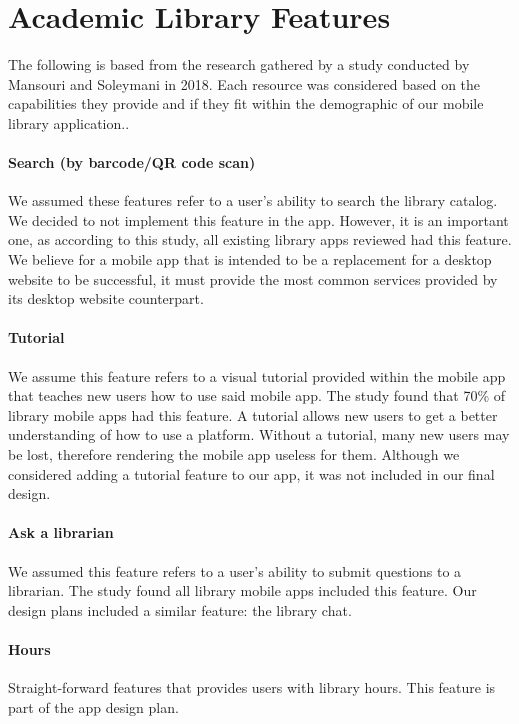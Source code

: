 \section{Academic Library Features}

    \noindent{} The following is based from the research gathered by a study conducted by Mansouri and  Soleymani in 2018. Each resource was considered based on the capabilities they provide and if they fit within the demographic of our mobile library application..
    
    \paragraph{Search (by barcode/QR code scan)}
    We assumed these features refer to a user's ability to search the library catalog. We decided to not implement this feature in the \appname app. However, it is an important one, as according to this study, all existing library apps reviewed had this feature. We believe for a mobile app that is intended to be a replacement for a desktop website to be successful, it must provide the most common services provided by its desktop website counterpart.
    
    \paragraph{Tutorial}
    We assume this feature refers to a visual tutorial provided within the mobile app that teaches new users how to use said mobile app. The study found that 70\% of library mobile apps had this feature. A tutorial allows new users to get a better understanding of how to use a platform. Without a tutorial, many new users may be lost, therefore rendering the mobile app useless for them. Although we considered adding a tutorial feature to our app, it was not included in our final design.
    
    \paragraph{Ask a librarian}
    We assumed this feature refers to a user's ability to submit questions to a librarian. The study found all library mobile apps included this feature. Our design plans included a similar feature: the library chat.
    
    \paragraph{Hours}
    Straight-forward features that provides users with library hours. This feature is part of the \appname app design plan.
    
